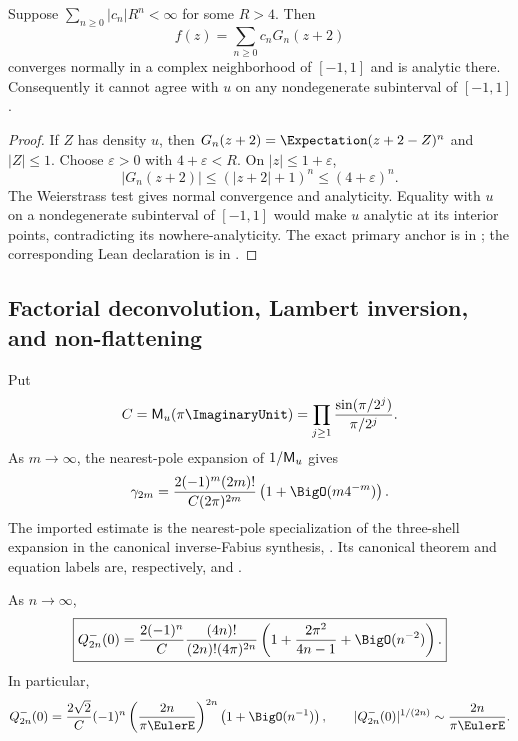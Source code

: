 \begin{theorem}
\label{thm:leg2-no-normal-closure}
Suppose $\sum_{n\ge0}|c_n|R^n<\infty$ for some $R>4$.  Then
\[
 f(z)=\sum_{n\ge0}c_nG_n(z+2)
\]
converges normally in a complex neighborhood of $[-1,1]$ and is analytic
there.  Consequently it cannot agree with $u$ on any nondegenerate
subinterval of $[-1,1]$.
\end{theorem}

\begin{proof}
If $Z$ has density $u$, then
$G_n(z+2)=\Expectation(z+2-Z)^n$ and $|Z|\le1$.  Choose $\varepsilon>0$ with
$4+\varepsilon<R$.  On $|z|\le1+\varepsilon$,
\[
 |G_n(z+2)|\le(|z+2|+1)^n\le(4+\varepsilon)^n.
\]
The Weierstrass test gives normal convergence and analyticity.  Equality with
$u$ on a nondegenerate subinterval of $[-1,1]$ would make $u$ analytic at its
interior points, contradicting its nowhere-analyticity.  The exact primary
anchor is  in
; the corresponding Lean declaration
is  in .
\end{proof}

\subsection{Factorial deconvolution, Lambert inversion, and non-flattening}

Put
\begin{equation}
 C=\MM_u(\pi\ImaginaryUnit)=
 \prod_{j\ge1}\frac{\sin(\pi/2^j)}{\pi/2^j}.
 \label{eq:leg2-C-constant}
\end{equation}
As $m\to\infty$, the nearest-pole expansion of $1/\mathsf M_u$ gives
\begin{equation}
 \gamma_{2m}=
 \frac{2(-1)^m(2m)!}{C(2\pi)^{2m}}
 \left(1+\BigO(m4^{-m})\right).
 \label{eq:leg2-gamma-asymptotic}
\end{equation}
The imported estimate is the nearest-pole specialization of the three-shell
expansion in the canonical inverse-Fabius synthesis,
.  Its canonical theorem
and equation labels are, respectively,
 and .

\begin{theorem}
\label{thm:leg2-Q0-asymptotic}
As $n\to\infty$,
\begin{equation}
 \boxed{Q_{2n}^-(0)=
 \frac{2(-1)^n}{C}
 \frac{(4n)!}{(2n)!(4\pi)^{2n}}
 \left(1+\frac{2\pi^2}{4n-1}+\BigO(n^{-2})\right).}
 \label{eq:leg2-Q0-asymptotic}
\end{equation}
In particular,
\begin{equation}
 Q_{2n}^-(0)=\frac{2\sqrt2}{C}(-1)^n
 \left(\frac{2n}{\pi\EulerE}\right)^{2n}
 \left(1+\BigO(n^{-1})\right),
 \qquad
 |Q_{2n}^-(0)|^{1/(2n)}\sim\frac{2n}{\pi\EulerE}.
 \label{eq:leg2-Q0-root}
\end{equation}
\end{theorem}

